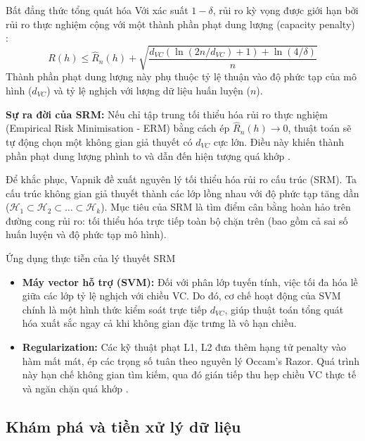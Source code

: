 \begin{importantbox}{Bất đẳng thức tổng quát hóa}
Với xác suất $1-\delta$, rủi ro kỳ vọng được giới hạn bởi rủi ro thực nghiệm cộng với một thành phần phạt dung lượng (capacity penalty) \cite{gerbelot2023applying}:
\begin{equation}
    R(h) \le \hat{R}_n(h) + \sqrt{\frac{d_{VC} \left( \ln(2n/d_{VC}) + 1 \right) + \ln(4/\delta)}{n}}
\end{equation}
Thành phần phạt dung lượng này phụ thuộc tỷ lệ thuận vào độ phức tạp của mô hình ($d_{VC}$) và tỷ lệ nghịch với lượng dữ liệu huấn luyện ($n$).
\end{importantbox}

\textbf{Sự ra đời của SRM:} Nếu chỉ tập trung tối thiểu hóa rủi ro thực nghiệm (Empirical Risk Minimisation - ERM) bằng cách ép $\hat{R}_n(h) \to 0$, thuật toán sẽ tự động chọn một không gian giả thuyết có $d_{VC}$ cực lớn. Điều này khiến thành phần phạt dung lượng phình to và dẫn đến hiện tượng quá khớp \cite{gerbelot2023applying}.

Để khắc phục, Vapnik đề xuất nguyên lý tối thiểu hóa rủi ro cấu trúc (SRM). Ta cấu trúc không gian giả thuyết thành các lớp lồng nhau với độ phức tạp tăng dần ($\mathcal{H}_1 \subset \mathcal{H}_2 \subset \dots \subset \mathcal{H}_k$). Mục tiêu của SRM là tìm điểm cân bằng hoàn hảo trên đường cong rủi ro: tối thiểu hóa trực tiếp toàn bộ chặn trên (bao gồm cả sai số huấn luyện và độ phức tạp mô hình).

\begin{examplebox}{Ứng dụng thực tiễn của lý thuyết SRM}
\begin{itemize}
    \item \textbf{Máy vector hỗ trợ (SVM):} Đối với phân lớp tuyến tính, việc tối đa hóa lề giữa các lớp tỷ lệ nghịch với chiều VC. Do đó, cơ chế hoạt động của SVM chính là một hình thức kiểm soát trực tiếp $d_{VC}$, giúp thuật toán tổng quát hóa xuất sắc ngay cả khi không gian đặc trưng là vô hạn chiều.
    \item \textbf{Regularization:} Các kỹ thuật phạt L1, L2 đưa thêm hạng tử penalty vào hàm mất mát, ép các trọng số tuân theo nguyên lý Occam's Razor. Quá trình này hạn chế không gian tìm kiếm, qua đó gián tiếp thu hẹp chiều VC thực tế và ngăn chặn quá khớp \cite{gerbelot2023applying}.
\end{itemize}
\end{examplebox}

\subsection{Khám phá và tiền xử lý dữ liệu}

